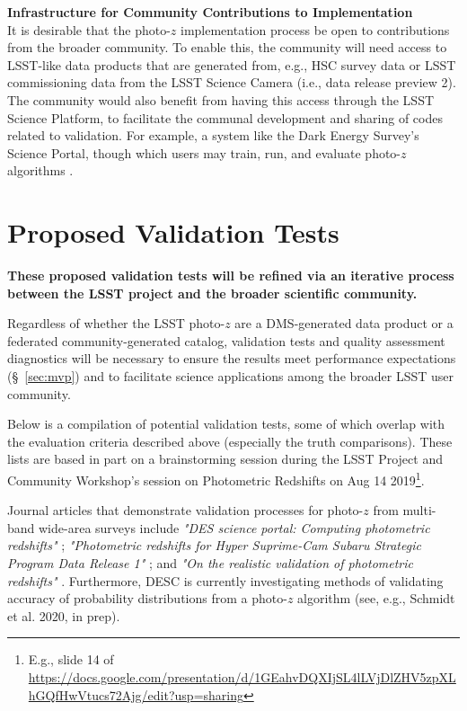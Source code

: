\documentclass[DM,lsstdraft,toc]{lsstdoc}
\begin{document}
\textbf{Infrastructure for Community Contributions to Implementation}\\
It is desirable that the photo-$z$ implementation process be open to contributions from the broader community.
To enable this, the community will need access to LSST-like data products that are generated from, e.g., HSC survey data or LSST commissioning data from the LSST Science Camera (i.e., data release preview 2).
The community would also benefit from having this access through the LSST Science Platform, to facilitate the communal development and sharing of codes related to validation.
For example, a system like the Dark Energy Survey's Science Portal, though which users may train, run, and evaluate photo-$z$ algorithms \citet{2018A&C....25...58G}.


\clearpage
\section{Proposed Validation Tests} \label{sec:val}

\textbf{These proposed validation tests will be refined via an iterative process between the LSST project and the broader scientific community.}

Regardless of whether the LSST photo-$z$ are a DMS-generated data product or a federated community-generated catalog, validation tests and quality assessment diagnostics will be necessary to ensure the results meet performance expectations (\S~\ref{sec:mvp}) and to facilitate science applications among the broader LSST user community. 

Below is a compilation of potential validation tests, some of which overlap with the evaluation criteria described above (especially the truth comparisons). 
These lists are based in part on a brainstorming session during the LSST Project and Community Workshop's session on Photometric Redshifts on Aug 14 2019\footnote{E.g., slide 14 of \url{https://docs.google.com/presentation/d/1GEahvDQXIjSL4lLVjDlZHV5zpXLhGQfHwVtucs72Ajg/edit?usp=sharing}}.

Journal articles that demonstrate validation processes for photo-$z$ from multi-band wide-area surveys include {\it "DES science portal: Computing photometric redshifts"} \citep{2018A&C....25...58G}; {\it "Photometric redshifts for Hyper Suprime-Cam Subaru Strategic Program Data Release 1"} \citep{2018PASJ...70S...9T}; and {\it "On the realistic validation of photometric redshifts"} \citep{2017MNRAS.468.4323B}. Furthermore, DESC is currently investigating methods of validating accuracy of probability distributions from a photo-$z$ algorithm (see, e.g., Schmidt et al. 2020, in prep).
\end{document}
